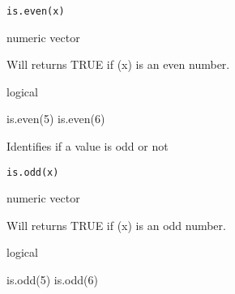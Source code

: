 \documentclass[a4paper]{book}
\begin{document}
%
\begin{Usage}
\begin{verbatim}
is.even(x)
\end{verbatim}
\end{Usage}
%
\begin{Arguments}
\begin{ldescription}
\item[\code{x}] numeric vector
\end{ldescription}
\end{Arguments}
%
\begin{Details}\relax
Will returns TRUE if (x) is an even number.
\end{Details}
%
\begin{Value}
logical
\end{Value}
%
\begin{SeeAlso}\relax
{}
\end{SeeAlso}
%
\begin{Examples}
\begin{ExampleCode}
is.even(5)
is.even(6)
\end{ExampleCode}
\end{Examples}
\newpage
{}
%
\begin{Description}\relax
Identifies if a value is odd or not
\end{Description}
%
\begin{Usage}
\begin{verbatim}
is.odd(x)
\end{verbatim}
\end{Usage}
%
\begin{Arguments}
\begin{ldescription}
\item[\code{x}] numeric vector
\end{ldescription}
\end{Arguments}
%
\begin{Details}\relax
Will returns TRUE if (x) is an odd number.
\end{Details}
%
\begin{Value}
logical
\end{Value}
%
\begin{SeeAlso}\relax
{}
\end{SeeAlso}
%
\begin{Examples}
\begin{ExampleCode}
is.odd(5)
is.odd(6)
\end{ExampleCode}
\end{Examples}
\end{document}
